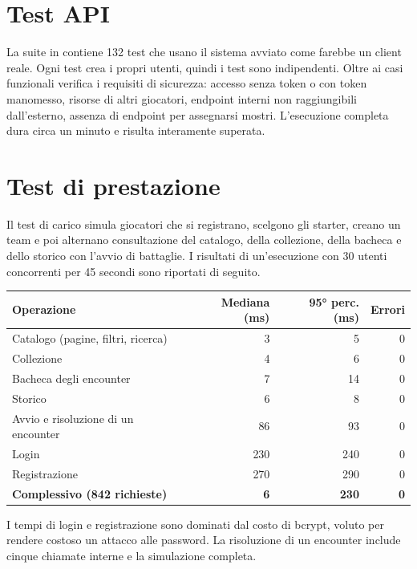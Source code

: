 \documentclass[11pt,a4paper]{report}
\begin{document}
\section{Test API}

La suite in  contiene 132 test che usano il sistema avviato come farebbe un client reale. Ogni test crea i propri utenti, quindi i test sono indipendenti. Oltre ai casi funzionali verifica i requisiti di sicurezza: accesso senza token o con token manomesso, risorse di altri giocatori, endpoint interni non raggiungibili dall'esterno, assenza di endpoint per assegnarsi mostri. L'esecuzione completa dura circa un minuto e risulta interamente superata.

\section{Test di prestazione}

Il test di carico simula giocatori che si registrano, scelgono gli starter, creano un team e poi alternano consultazione del catalogo, della collezione, della bacheca e dello storico con l'avvio di battaglie. I risultati di un'esecuzione con 30 utenti concorrenti per 45 secondi sono riportati di seguito.

\begin{center}\small
\begin{tabular}{@{}lrrr@{}}
\toprule
\textbf{Operazione} & \textbf{Mediana (ms)} & \textbf{95° perc. (ms)} & \textbf{Errori} \\
\midrule
Catalogo (pagine, filtri, ricerca) & 3 & 5 & 0 \\
Collezione & 4 & 6 & 0 \\
Bacheca degli encounter & 7 & 14 & 0 \\
Storico & 6 & 8 & 0 \\
Avvio e risoluzione di un encounter & 86 & 93 & 0 \\
Login & 230 & 240 & 0 \\
Registrazione & 270 & 290 & 0 \\
\midrule
\textbf{Complessivo (842 richieste)} & \textbf{6} & \textbf{230} & \textbf{0} \\
\bottomrule
\end{tabular}
\end{center}

I tempi di login e registrazione sono dominati dal costo di bcrypt, voluto per rendere costoso un attacco alle password. La risoluzione di un encounter include cinque chiamate interne e la simulazione completa.
\end{document}
